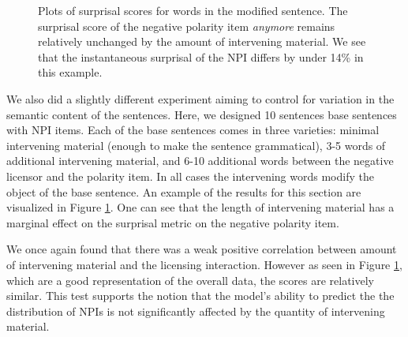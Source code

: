 \documentclass[11pt, round]{article}
\begin{document}
\begin{figure}
    \centering
    \caption{Plots of surprisal scores for words in the modified sentence. The surprisal score of the negative polarity item \textit{anymore} remains relatively unchanged by the amount of intervening material. We see that the instantaneous surprisal of the NPI  differs by under 14\% in this example.}
    \label{fig:intervening2}
\end{figure}
We also did a slightly different experiment aiming to control for variation in the semantic content of the sentences. Here, we designed 10 sentences base sentences with NPI items. Each of the base sentences comes in three varieties: minimal intervening material (enough to make the sentence grammatical), 3-5 words of additional intervening material, and 6-10 additional words between the negative licensor and the polarity item. In all cases the intervening words modify the object of the base sentence. An example of the results for this section are visualized in Figure \ref{fig:intervening2}. One can see that the length of intervening material has a marginal effect on the surprisal metric on the negative polarity item.



We once again found that there was a weak positive correlation between amount of intervening material and the licensing interaction. However as seen in Figure \ref{fig:intervening2}, which are a good representation of the overall data, the scores are relatively similar. This test supports the notion that the model's ability to predict the the distribution of NPIs is not significantly affected by the quantity of intervening material.

\end{document}
